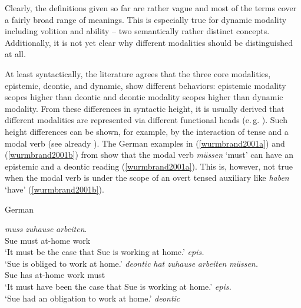 Clearly, the definitions given so far are rather vague and most of the terms cover a fairly broad range of meanings. This is especially true for dynamic modality including volition and ability -- two semantically rather distinct concepts. Additionally, it is not yet clear why different modalities should be distinguished at all. 


At least syntactically, the literature agrees that the three core modalities, epistemic, deontic, and dynamic, show different behaviors: epistemic modality scopes higher than deontic and deontic modality scopes higher than dynamic modality. From these differences in syntactic height, it is usually derived that different modalities are represented via different functional heads (e.\,g. \citealt{cinque1999adverbs, wurmbrand2001finitive, butler2003minimalist}). Such height differences can be shown, for example, by the interaction of tense and a modal verb (see already \citealt{groenendijk1975modality}). The German examples in (\ref{wurmbrand2001a}) and (\ref{wurmbrand2001b}) from \citet[184]{wurmbrand2001finitive} show that the modal verb \textit{müssen} `must' can have an epistemic and a deontic reading (\ref{wurmbrand2001a}). This is, however, not true when the modal verb is under the scope of an overt tensed auxiliary like \textit{haben} `have' (\ref{wurmbrand2001b}). 



\begin{exe} 
\ex German \citep[184]{wurmbrand2001finitive}
\begin{xlist} 
\ex {} {\textit{muss}} {\textit{zuhause}} {\textit{arbeiten}.}\\
{\textcolor{white}{\cmark}Sue} {must} {at-home} {work}\\
\trans \cmark`It must be the case that Sue is working at home.' \hfill{\textit{epis.}}\\
\cmark `Sue is obliged to work at home.' \hfill{\textit{deontic}}\label{wurmbrand2001a}
\ex {} {\textit{hat}} {\textit{zuhause}} {\textit{arbeiten}} {\textit{müssen.}}  \\
{\textcolor{white}{\cmark}Sue} {has} {at-home} {work} {must} \\
\trans \xmark `It must have been the case that Sue is working at home.' \hfill{\textit{epis.}} \\
\cmark `Sue had an obligation to work at home.' \hfill{\textit{deontic}}\label{wurmbrand2001b} 
\end{xlist} 
\end{exe} 

